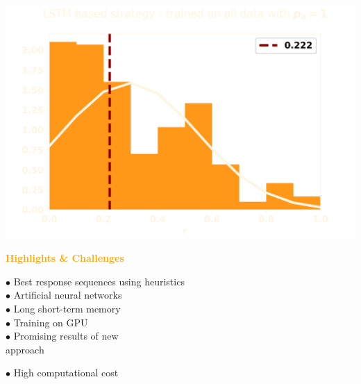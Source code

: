 \documentclass{beamer}
\begin{document}
\begin{frame}
    \begin{center}
    
    \end{center}
\end{frame}

\begin{frame}
    \begin{center}
    \includegraphics[width=.75\textwidth]{static/lstm_result.png}
    \end{center}
\end{frame}

\begin{frame}
    \begin{center}
        \Large{\textbf{\textcolor{orange}{Highlights \& Challenges}}}
    \end{center}
    \vspace{.8cm} \pause

    \begin{minipage}{.5\textwidth}
        \(\bullet\) Best response sequences using heuristics  \vspace{.1cm} \\ \pause
        \(\bullet\) Artificial neural networks \vspace{.1cm} \\ \pause
        \(\bullet\) Long short-term memory \vspace{.1cm} \\ \pause
        \(\bullet\) Training on GPU \vspace{.1cm} \\ \pause
        \(\bullet\) Promising results of new \\ approach \pause
    \end{minipage} \hfill
    \begin{minipage}{.45\textwidth}
        \(\bullet\) High computational cost \vspace{.1cm}
    \end{minipage}
\end{frame}
\end{document}
